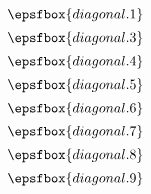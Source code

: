 

$$\epsfbox{diagonal.1}$$
$$\epsfbox{diagonal.3}$$
$$\epsfbox{diagonal.4}$$
$$\epsfbox{diagonal.5}$$
$$\epsfbox{diagonal.6}$$
$$\epsfbox{diagonal.7}$$
$$\epsfbox{diagonal.8}$$
$$\epsfbox{diagonal.9}$$

\bye

